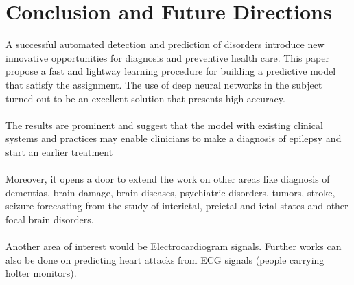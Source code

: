 \documentclass{llncs}       %
\begin{document}
\section{Conclusion and Future Directions}
\label{sec:4}



A successful automated detection and prediction of disorders introduce new innovative opportunities for diagnosis and preventive health care.  This paper propose a fast and lightway learning procedure for building a predictive model that satisfy the assignment.  The use of deep neural networks in the subject turned out to be an excellent solution that presents high accuracy. 
\paragraph{}
The results are prominent and suggest that the model with existing clinical systems and practices may enable clinicians to make a diagnosis of epilepsy and start an earlier treatment
\paragraph{}
Moreover, it opens a door to extend the work on other areas like diagnosis of dementias, brain damage, brain diseases, psychiatric disorders, tumors, stroke,  seizure forecasting from the study of  interictal, preictal and ictal states and other focal brain disorders.
\paragraph{}
Another area of interest would be Electrocardiogram signals.  Further works can also be done on predicting heart attacks from ECG signals (people carrying holter monitors).
\end{document}
